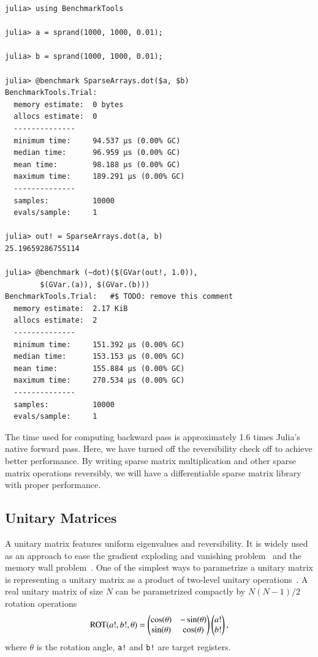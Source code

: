 \documentclass{article}
\newcommand{\<}{\langle}
\renewcommand{\>}{\rangle}
\theoremstyle{definition}\newtheorem{definition}{\textit{Definition}}
\begin{document}
\begin{minipage}{\columnwidth}
\begin{lstlisting}[multicols=2]
julia> using BenchmarkTools

julia> a = sprand(1000, 1000, 0.01);

julia> b = sprand(1000, 1000, 0.01);

julia> @benchmark SparseArrays.dot($a, $b)
BenchmarkTools.Trial: 
  memory estimate:  0 bytes
  allocs estimate:  0
  --------------
  minimum time:     94.537 μs (0.00% GC)
  median time:      96.959 μs (0.00% GC)
  mean time:        98.188 μs (0.00% GC)
  maximum time:     189.291 μs (0.00% GC)
  --------------
  samples:          10000
  evals/sample:     1

julia> out! = SparseArrays.dot(a, b)
25.19659286755114

julia> @benchmark (~dot)($(GVar(out!, 1.0)),
        $(GVar.(a)), $(GVar.(b)))
BenchmarkTools.Trial:   #$ TODO: remove this comment
  memory estimate:  2.17 KiB
  allocs estimate:  2
  --------------
  minimum time:     151.392 μs (0.00% GC)
  median time:      153.153 μs (0.00% GC)
  mean time:        155.884 μs (0.00% GC)
  maximum time:     270.534 μs (0.00% GC)
  --------------
  samples:          10000
  evals/sample:     1
\end{lstlisting}
\end{minipage}

The time used for computing backward pass is approximately 1.6 times Julia's native forward pass.
Here, we have turned off the reversibility check off to achieve better performance.
By writing sparse matrix multiplication and other sparse matrix operations reversibly,
we will have a differentiable sparse matrix library with proper performance.

\subsection{Unitary Matrices}\label{sec:umm}
A unitary matrix features uniform eigenvalues and reversibility. It is widely used as an approach to ease the gradient exploding and vanishing problem~\cite{Arjovsky2015,Wisdom2016,Li2016} and the memory wall problem~\cite{Luo2019}.
One of the simplest ways to parametrize a unitary matrix is representing a unitary matrix as a product of two-level unitary operations~\cite{Li2016}. A real unitary matrix of size $N$ can be parametrized compactly by $N(N-1)/2$ rotation operations~\cite{Li2013}
\begin{align}
    {\rm ROT}(a!, b!, \theta)  = \left(\begin{matrix}
        \cos(\theta) & - \sin(\theta)\\
        \sin(\theta)  & \cos(\theta)
    \end{matrix}\right)
    \left(\begin{matrix}
        a!\\
        b!
    \end{matrix}\right),
\end{align}
where \texttt{$\theta$} is the rotation angle, \texttt{a!} and \texttt{b!} are target registers.
\end{document}
